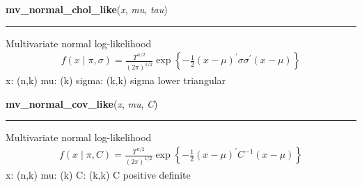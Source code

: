 \hspace{.8\funcindent}\begin{boxedminipage}{\funcwidth}

    \raggedright \textbf{mv\_normal\_chol\_like}(\textit{x}, \textit{mu}, \textit{tau})

    \vspace{-1.5ex}

    \rule{\textwidth}{0.5\fboxrule}
\setlength{\parskip}{2ex}

Multivariate normal log-likelihood
\begin{equation*}\begin{split}f(x \mid \pi, \sigma) = \frac{T^{n/2}}{(2\pi)^{1/2}} \exp\left\{ -\frac{1}{2} (x-\mu)^{\prime}\sigma \sigma^{\prime}(x-\mu) \right\}\end{split}\end{equation*}
x: (n,k)
mu: (k)
sigma: (k,k)
sigma lower triangular
\setlength{\parskip}{1ex}
    \end{boxedminipage}

    \label{pymc:distributions:mv_normal_cov_like}

    \vspace{0.5ex}

\hspace{.8\funcindent}\begin{boxedminipage}{\funcwidth}

    \raggedright \textbf{mv\_normal\_cov\_like}(\textit{x}, \textit{mu}, \textit{C})

    \vspace{-1.5ex}

    \rule{\textwidth}{0.5\fboxrule}
\setlength{\parskip}{2ex}

Multivariate normal log-likelihood
\begin{equation*}\begin{split}f(x \mid \pi, C) = \frac{T^{n/2}}{(2\pi)^{1/2}} \exp\left\{ -\frac{1}{2} (x-\mu)^{\prime}C^{-1}(x-\mu) \right\}\end{split}\end{equation*}
x: (n,k)
mu: (k)
C: (k,k)
C positive definite
\setlength{\parskip}{1ex}
    \end{boxedminipage}

    \label{pymc:distributions:mv_normal_like}

    \vspace{0.5ex}

